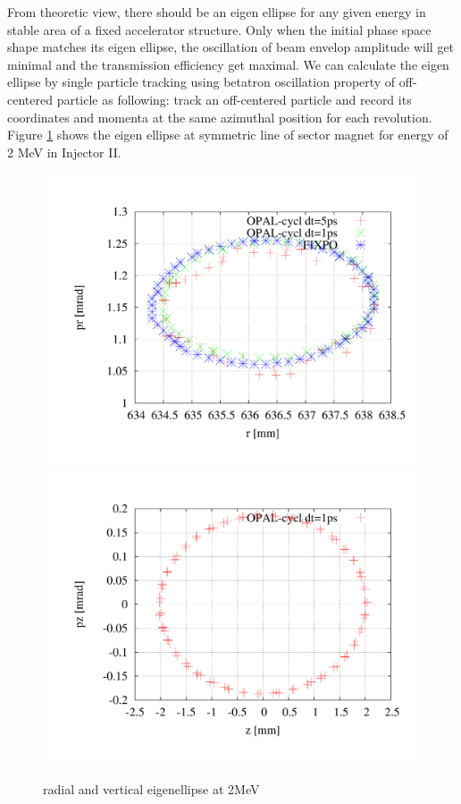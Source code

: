 From theoretic view, there should be an eigen ellipse for any given energy in stable area of a fixed accelerator structure. Only when the initial phase space
shape matches its eigen ellipse, the oscillation of beam envelop amplitude will get minimal and the transmission efficiency get maximal.
We can calculate the eigen ellipse by single particle tracking using betatron oscillation property of off-centered particle as following: track 
an off-centered particle and record its coordinates and momenta at the same azimuthal position for each revolution.    
Figure \ref{fig:eigen} shows the eigen ellipse at symmetric line of sector magnet for energy of 2 MeV in Injector II.
\begin{figure}[ht]
 \begin{center} 
   \includegraphics[width=0.45\linewidth,angle=0]{figures/cyclotron/RadialEigen_Inj2}
   \includegraphics[width=0.45\linewidth,angle=0]{figures/cyclotron/VertEigen_Inj2}
   \caption{radial and vertical eigenellipse at 2MeV}   
   \label{fig:eigen}
 \end{center}
\end{figure}
 
